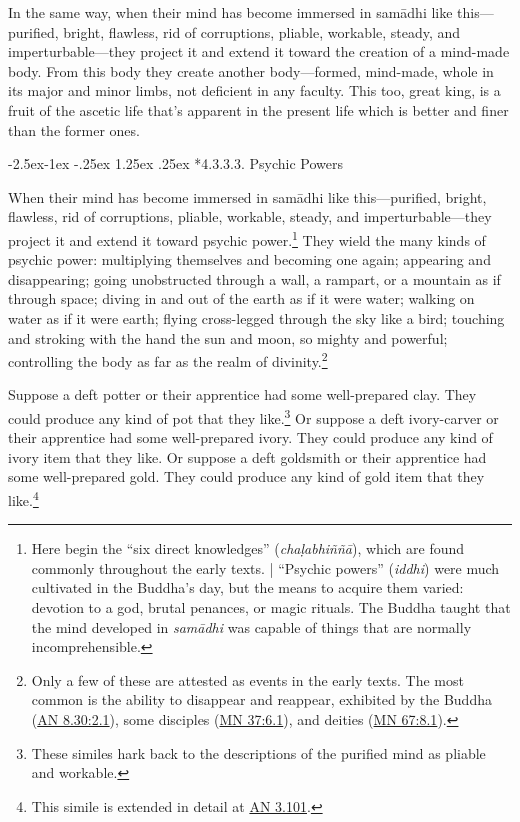 \documentclass[12pt,openany]{book}%
\makeatletter
\renewcommand\paragraph{\@startsection{paragraph}{4}{\z@}%
            {-2.5ex\@plus -1ex \@minus -.25ex}%
            {1.25ex \@plus .25ex}%
            {\noindent\normalfont\itshape\small}}
\makeatother
\begin{document}
In the same way, when their mind has become immersed in \textsanskrit{samādhi} like this—purified, bright, flawless, rid of corruptions, pliable, workable, steady, and imperturbable—they project it and extend it toward the creation of a mind-made body. From this body they create another body—formed, mind-made, whole in its major and minor limbs, not deficient in any faculty. This too, great king, is a fruit of the ascetic life that’s apparent in the present life which is better and finer than the former ones. 

\paragraph*{4.3.3.3. Psychic Powers }

When their mind has become immersed in \textsanskrit{samādhi} like this—purified, bright, flawless, rid of corruptions, pliable, workable, steady, and imperturbable—they project it and extend it toward psychic power.\footnote{Here begin the “six direct knowledges” (\textit{\textsanskrit{chaḷabhiññā}}), which are found commonly throughout the early texts. | “Psychic powers” (\textit{iddhi}) were much cultivated in the Buddha’s day, but the means to acquire them varied: devotion to a god, brutal penances, or magic rituals. The Buddha taught that the mind developed in \textit{\textsanskrit{samādhi}} was capable of things that are normally incomprehensible. } They wield the many kinds of psychic power: multiplying themselves and becoming one again; appearing and disappearing; going unobstructed through a wall, a rampart, or a mountain as if through space; diving in and out of the earth as if it were water; walking on water as if it were earth; flying cross-legged through the sky like a bird; touching and stroking with the hand the sun and moon, so mighty and powerful; controlling the body as far as the realm of divinity.\footnote{Only a few of these are attested as events in the early texts. The most common is the ability to disappear and reappear, exhibited by the Buddha (\href{https://suttacentral.net/an8.30/en/sujato\#2.1}{AN 8.30:2.1}), some disciples (\href{https://suttacentral.net/mn37/en/sujato\#6.1}{MN 37:6.1}), and deities (\href{https://suttacentral.net/mn67/en/sujato\#8.1}{MN 67:8.1}). } 

Suppose a deft potter or their apprentice had some well-prepared clay. They could produce any kind of pot that they like.\footnote{These similes hark back to the descriptions of the purified mind as pliable and workable. } Or suppose a deft ivory-carver or their apprentice had some well-prepared ivory. They could produce any kind of ivory item that they like. Or suppose a deft goldsmith or their apprentice had some well-prepared gold. They could produce any kind of gold item that they like.\footnote{This simile is extended in detail at \href{https://suttacentral.net/an3.101/en/sujato}{AN 3.101}. } 
\end{document}
